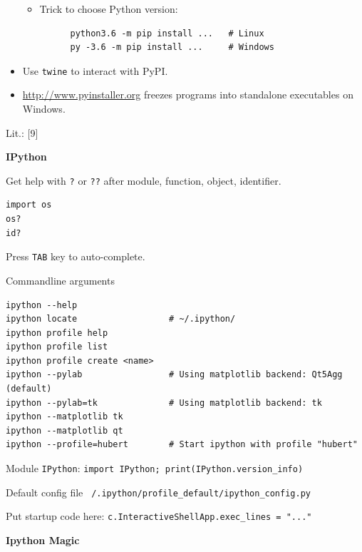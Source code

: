 \documentclass[9pt,a4wide]{extarticle}
\begin{document}
\begin{itemize}
\begin{itemize}
   \item Trick to choose Python version:
   
      \begin{verbatim}
      python3.6 -m pip install ...   # Linux
      py -3.6 -m pip install ...     # Windows
      \end{verbatim}

   \end{itemize}

   \item Use {\tt twine} to interact with PyPI.

   \item \url{http://www.pyinstaller.org} freezes programs into standalone
         executables on Windows.

\end{itemize}

Lit.: [9]

\label{ipython-section}

\medskip
{\bf IPython}

Get help with {\tt ?} or {\tt ??} after module, function, 
object, identifier.

\begin{verbatim}
import os
os?
id?
\end{verbatim}

Press {\tt TAB} key to auto-complete.

Commandline arguments

\begin{verbatim}
ipython --help
ipython locate                  # ~/.ipython/
ipython profile help    
ipython profile list
ipython profile create <name>   
ipython --pylab                 # Using matplotlib backend: Qt5Agg (default)
ipython --pylab=tk              # Using matplotlib backend: tk
ipython --matplotlib tk
ipython --matplotlib qt
ipython --profile=hubert        # Start ipython with profile "hubert"
\end{verbatim}

Module {\tt IPython}: {\tt import IPython; print(IPython.version\_info)}

Default config file {\tt ~/.ipython/profile\_default/ipython\_config.py}

Put startup code here: {\tt c.InteractiveShellApp.exec\_lines = "..."}


\medskip
{\bf Ipython Magic}
\end{document}
